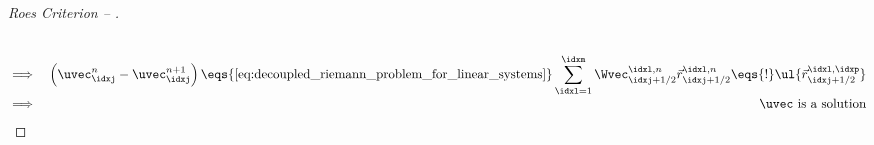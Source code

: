 \begin{proofbox}
\begin{proof}[Roes Criterion -- ]
\begin{align*}
\begin{aligned}
          \end{aligned}
        \end{align*}
        \begin{align*}
          \implies&&\left(\uvec_{\idxj}^{n}-\uvec_{\idxj}^{n+1}\right)\eqs{\text{\cref{eq:decoupled_riemann_problem_for_linear_systems}}}\sum_{\idxl=1}^{\idxm}\Wvec_{\idxj+1/2}^{\idxl,n}\vec{r}_{\idxj+1/2}^{\idxl,n}\eqs{!}
          \ul{\vec{r}_{\idxj+1/2}^{\idxl,\idxp}}\\[-1\jot]
          \implies&&\uvec\text{ is a solution}
        \end{align*}
    \end{proof}
\end{proofbox}

